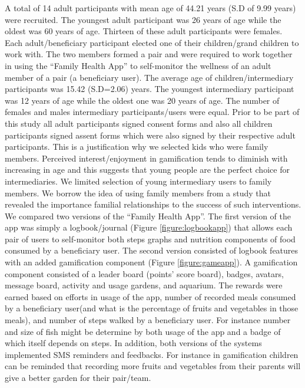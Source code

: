 \documentclass{sig-alternate}
\begin{document}
A total of 14 adult participants with mean age of 44.21 years (S.D of 9.99 years) were recruited.  The youngest adult participant was 26 years of age while the oldest was 60 years of age. Thirteen of these adult participants were females. Each adult/beneficiary participant  elected one of their children/grand children to work with. The two members formed a pair and were required to work together in using the ``Family Health App'' to self-monitor the wellness of an adult member of a pair (a beneficiary user). The average age of children/intermediary participants was 15.42 (S.D=2.06) years. The youngest intermediary participant was 12 years of age while the oldest one was 20 years of age. The number of females and males intermediary participants/users were equal. Prior to be part of this study all adult participants signed consent forms and also all children participants signed assent forms which were also signed by their respective adult participants. This is a justification why we selected kids who were family members. Perceived interest/enjoyment in gamification tends to diminish with increasing in age \cite{v2014motivational} and this suggests that young people are the perfect choice for intermediaries. We limited selection of young intermediary users to family members. We borrow the idea of using family members from a study \cite{katule2016:leveraging} that revealed the importance familial relationships to the success of such interventions.\newline
We compared two versions of the ``Family Health App''. The first version of the app was simply a logbook/journal (Figure \ref{figure:logbookapp}) that allows each pair of users to self-monitor both steps graphs and nutrition components of food consumed by a beneficiary user. The second version consisted of logbook features with an added gamification component (Figure \ref{figure:gameapp}). A gamification component consisted of a leader board (points' score board), badges, avatars, message board, activity and usage gardens, and aquarium. The rewards were earned based on efforts in usage of the app, number of recorded meals consumed by a beneficiary user(and what is the percentage of fruits and vegetables in those meals), and number of steps walked by a beneficiary user. For instance  number and size of fish might be determine by both usage of the app and a badge of which itself depends on steps.  In addition, both versions of the systems implemented SMS reminders and feedbacks. For instance in gamification children can be reminded that recording more fruits and vegetables from their parents will give a better garden for their pair/team.\newline 
\end{document}
